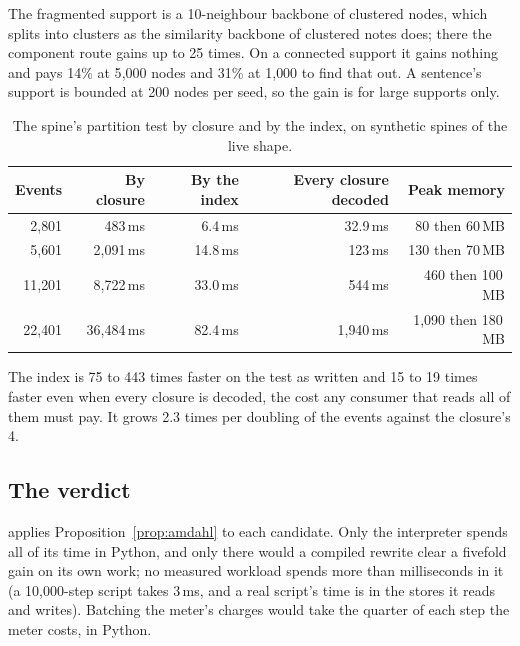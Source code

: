 \documentclass[11pt]{article}
\theoremstyle{plain}
\theoremstyle{definition}
\theoremstyle{remark}
\begin{document}
The fragmented support is a 10-neighbour backbone of clustered nodes, which splits into clusters
as the similarity backbone of clustered notes does; there the component route gains up to 25
times. On a connected support it gains nothing and pays 14\% at 5{,}000 nodes and 31\% at 1{,}000
to find that out. A sentence's support is bounded at 200 nodes per seed, so the gain is for large
supports only.

\begin{table}[ht]
\centering\small
\caption{The spine's partition test by closure and by the index, on synthetic spines of the live
shape.}\label{tab:spine}
\begin{tabular}{@{}rrrrr@{}}
\toprule
Events & By closure & By the index & Every closure decoded & Peak memory \\
\midrule
2{,}801 & 483\,ms & 6.4\,ms & 32.9\,ms & 80 then 60\,MB \\
5{,}601 & 2{,}091\,ms & 14.8\,ms & 123\,ms & 130 then 70\,MB \\
11{,}201 & 8{,}722\,ms & 33.0\,ms & 544\,ms & 460 then 100\,MB \\
22{,}401 & 36{,}484\,ms & 82.4\,ms & 1{,}940\,ms & 1{,}090 then 180\,MB \\
\bottomrule
\end{tabular}
\end{table}

The index is 75 to 443 times faster on the test as written and 15 to 19 times faster even when every
closure is decoded, the cost any consumer that reads all of them must pay. It grows 2.3 times per
doubling of the events against the closure's 4.

\subsection{The verdict}\label{sec:verdict}
 applies Proposition~\ref{prop:amdahl} to each candidate. Only the interpreter spends all of
its time in Python, and only there would a compiled rewrite clear a fivefold gain on its own work;
no measured workload spends more than milliseconds in it (a 10{,}000-step script takes 3\,ms, and a
real script's time is in the stores it reads and writes). Batching the meter's charges would take the
quarter of each step the meter costs, in Python.
\end{document}
